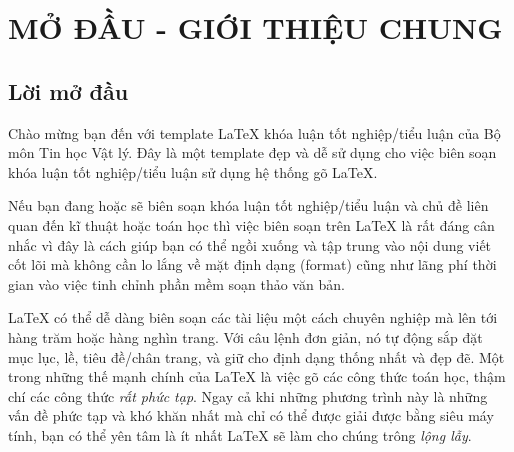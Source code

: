 
\chapter{MỞ ĐẦU - GIỚI THIỆU CHUNG} %

\label{Chapter1} %


\newcommand{\keyword}[1]{\textbf{#1}}
\newcommand{\tabhead}[1]{\textbf{#1}}
\newcommand{\code}[1]{\texttt{#1}}
\newcommand{\file}[1]{\texttt{\bfseries#1}}
\newcommand{\option}[1]{\texttt{\itshape#1}}


\section{Lời mở đầu}

Chào mừng bạn đến với template \LaTeX{} khóa luận tốt nghiệp/tiểu luận của Bộ môn Tin học Vật lý. Đây là một template đẹp và dễ sử dụng cho việc biên soạn khóa luận tốt nghiệp/tiểu luận sử dụng hệ thống gõ \LaTeX{}.

Nếu bạn đang hoặc sẽ biên soạn khóa luận tốt nghiệp/tiểu luận và chủ đề liên quan đến kĩ thuật hoặc toán học thì việc biên soạn trên \LaTeX{} là rất đáng cân nhắc vì đây là cách giúp bạn có thể ngồi xuống và tập trung vào nội dung viết cốt lõi mà không cần lo lắng về mặt định dạng (format) cũng như lãng phí thời gian vào việc tinh chỉnh phần mềm soạn thảo văn bản.

\LaTeX{} có thể dễ dàng biên soạn các tài liệu một cách chuyên nghiệp mà lên tới hàng trăm hoặc hàng nghìn trang. Với câu lệnh đơn giản, nó tự động sắp đặt mục lục, lề, tiêu đề/chân trang, và giữ cho định dạng thống nhất và đẹp đẽ. Một trong những thế mạnh chính của \LaTeX{} là việc gõ các công thức toán học, thậm chí các công thức \emph{rất phức tạp}. Ngay cả khi những phương trình này là những vấn đề phức tạp và khó khăn nhất mà chỉ có thể được giải được bằng siêu máy tính, bạn có thể yên tâm là ít nhất \LaTeX{} sẽ làm cho chúng trông \emph{lộng lẫy}.



